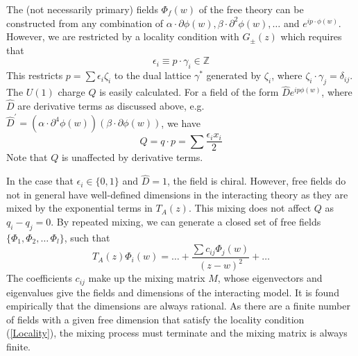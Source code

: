 \documentclass[a4paper,a4paper]{article}
\begin{document}
The (not necessarily primary) fields $\Phi_f(w)$ of the free theory can be constructed 
from any combination of $\alpha\cdot\partial \phi(w), \beta\cdot\partial^2 \phi(w), \dots$ and $e^{ip\cdot\phi(w)}$.
However, we are restricted by a locality condition with $G_{\pm}(z)$ which requires that
\begin{equation}
\label{Locality}
\epsilon_i \equiv p \cdot \gamma_i \in \mathbb{Z} 
\end{equation}
This restricts $p = \sum \epsilon_i \zeta_i$ to the dual lattice $\gamma^{*}$ generated by $\zeta_i$, where $\zeta_i \cdot \gamma_j = \delta_{ij}$. 
The $U(1)$ charge $Q$ is easily calculated. 
For a field of the form $\hat{D}e^{ip\phi(w)}$, where $\hat{D}$ are derivative terms as discussed above, e.g.
$\hat{D}^{'} = (\alpha\cdot\partial^4\phi(w))(\beta \cdot \partial \phi(w))$, we have
\begin{equation}
\label{Qvalue}
Q = q \cdot p = \sum \frac{\epsilon_i x_i}{2}
\end{equation}
Note that $Q$ is unaffected by derivative terms.

In the case that $\epsilon_i \in \{0,1\}$ and $\hat{D} = 1$, the field is chiral. However,
free fields do not in general have well-defined dimensions in the interacting theory
as they are mixed by the exponential terms in $T_A(z)$. 
This mixing does not affect $Q$ as $q_i - q_j = 0$. 
By repeated mixing, we can generate a closed set of
free fields $\{ \Phi_1, \Phi_2, \ldots \, \Phi_l\}$, such that
\begin{equation}
T_A(z)\Phi_i(w) = \ldots + \frac{\sum c_{ij} \Phi_j(w)}{(z-w)^2} + \ldots
\end{equation}
The coefficients $c_{ij}$ make up the mixing matrix $M$, whose eigenvectors and eigenvalues give
the fields and dimensions of the interacting model. 
It is found empirically that the dimensions are always rational\cite{Gepner}. As
there are a finite number of fields with a given free dimension that satisfy the locality condition
(\ref{Locality}), the mixing process must terminate
and the mixing matrix is always finite. 
\end{document}
